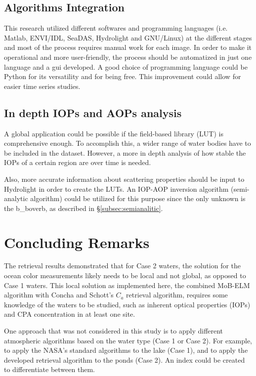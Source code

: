 \subsection{Algorithms Integration}
This research utilized different softwares and programming languages (i.e. Matlab, ENVI/IDL, SeaDAS, Hydrolight and GNU/Linux) at the different stages and most of the process requires manual work for each image. In order to make it operational and more user-friendly, the process should be automatized in just one language and a \gls{gui} developed. A good choice of programming language could be Python for its versatility and for being free. This improvement could allow for easier time series studies.

\subsection{In depth IOPs and AOPs analysis}
A global application could be possible if the field-based library (LUT) is comprehensive enough. To accomplish this, a wider range of water bodies have to be included in the dataset. However, a more in depth analysis of how stable the IOPs of a certain region are over time is needed. 

Also, more accurate information about scattering properties should be input to Hydrolight in order to create the LUTs. An IOP-AOP inversion algorithm (semi-analytic algorithm) could be utilized for this purpose since the only unknown is the \gls{b_boverb}, as described in \S\ref{subsec:semianalitic}.

\section{Concluding Remarks}
The retrieval results demonstrated that for Case 2 waters, the solution for the ocean color measurements likely needs to be local and not global, as opposed to Case 1 waters. This local solution as implemented here, the combined MoB-ELM algorithm with Concha and Schott's $C_a$ retrieval algorithm, requires some knowledge of the waters to be studied, such as inherent optical properties (IOPs) and CPA concentration in at least one site.

One approach that was not considered in this study is to apply different atmospheric algorithms based on the water type (Case 1 or Case 2). For example, to apply the NASA's standard algorithms to the lake (Case 1), and to apply the developed retrieval algorithm to the ponds (Case 2). An index could be created to differentiate between them.

